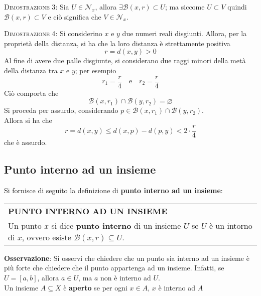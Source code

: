 \documentclass[a4paper]{extarticle}
\renewcommand\arraystretch{}
\begin{document}
\vspace{2em}
\noindent
\normalfont \normalsize
\textsc{Dimostrazione 3}: Sia $U \in \mathcal{N}_x$, allora $\exists \mathcal{B}(x,r) \subset U$; ma siccome $U \subset V$ quindi $\mathcal{B}(x,r) \subset V$ e ciò significa che $V \in \mathcal{N}_x$.

\vspace{2em}
\noindent
\normalfont \normalsize
\textsc{Dimostrazione 4}: Si considerino $x$ e $y$ due numeri reali disgiunti. Allora, per la proprietà della distanza, si ha che la loro distanza è strettamente positiva
\[r = d(x,y) > 0\]
Al fine di avere due palle disgiunte, si considerano due raggi minori della metà della distanza tra $x$ e $y$; per esempio
\[r_1=\frac{r}{4} \hspace{1em} \text{e} \hspace{1em} r_2=\frac{r}{4}\]
Ciò comporta che
\[\mathcal{B}(x,r_1) \cap \mathcal{B}(y,r_2) = \varnothing\]
Si proceda per assurdo, considerando $p \in \mathcal{B}(x,r_1) \cap \mathcal{B}(y,r_2)$.\\
Allora si ha che
\[r=d(x,y) \leq d(x,p) - d(p,y) < 2 \cdot \frac{r}{4}\]
che è assurdo.

\vspace{1em}
\noindent
\subsection{Punto interno ad un insieme}
Si fornisce di seguito la definizione di \textbf{punto interno ad un insieme}:

\vspace{1em}
\setlength{\tabcolsep}{14pt}
\renewcommand{\arraystretch}{2}
\noindent
\begin{tabularx}{\textwidth}{@{}|P|@{}}
    \hline
    {\textbf{PUNTO INTERNO AD UN INSIEME}}\\
    \parbox{\linewidth}{Un punto $x$ si dice \textbf{punto interno} di un insieme $U$ se $U$ è un intorno di $x$, ovvero esiste $\mathcal{B}(x,r) \subseteq U$. \vspace{3mm}}\\
    \hline
\end{tabularx}

\vspace{1em}
\noindent
\textbf{Osservazione}: Si osservi che chiedere che un punto sia interno ad un insieme è più forte che chiedere che il punto appartenga ad un insieme. Infatti, se $U = [a,b]$, allora $a \in U$, ma $a$ non è interno ad $U$.\\
Un insieme $A \subseteq X$ è \textbf{aperto} se per ogni $x \in A$, $x$ è interno ad $A$
\end{document}
